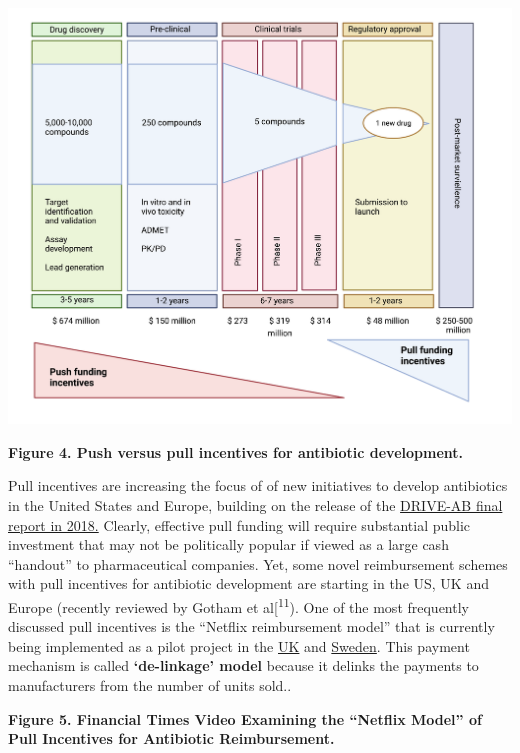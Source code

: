 \documentclass[
]{book}
\begin{document}
\includegraphics{images/push.png}

\textbf{Figure 4. Push versus pull incentives for antibiotic development.}

Pull incentives are increasing the focus of of new initiatives to develop antibiotics in the United States and Europe, building on the release of the \href{http://drive-ab.eu/wp-content/uploads/2018/01/DRIVE-AB-Final-Report-Jan2018.pdf}{DRIVE-AB final report in 2018.} Clearly, effective pull funding will require substantial public investment that may not be politically popular if viewed as a large cash ``handout'' to pharmaceutical companies. Yet, some novel reimbursement schemes with pull incentives for antibiotic development are starting in the US, UK and Europe (recently reviewed by Gotham et al{[}\textsuperscript{11}). One of the most frequently discussed pull incentives is the ``Netflix reimbursement model'' that is currently being implemented as a pilot project in the \href{https://www.gov.uk/government/news/world-first-scheme-underway-to-tackle-amr-and-protect-uk-patients}{UK} and \href{https://www.folkhalsomyndigheten.se/the-public-health-agency-of-sweden/communicable-disease-control/antibiotics-and-antimicrobial-resistance/availability-of-antibiotics/}{Sweden}. This payment mechanism is called \textbf{`de-linkage' model} because it delinks the payments to manufacturers from the number of units sold..

\textbf{Figure 5. Financial Times Video Examining the ``Netflix Model'' of Pull Incentives for Antibiotic Reimbursement.}
\end{document}
